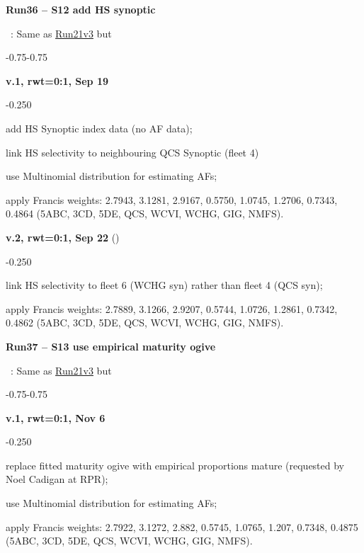 \hypertarget{R36}{\textbf{Run36 -- S12 add HS synoptic}}~: Same as \hyperlink{R21}{Run21v3} but
\begin{itemize_csas}{-0.75}{-0.75}
	\item \textbf{v.1, rwt=0:1, Sep 19}
	\begin{itemize_csas}{-0.25}{0}
		\item add HS Synoptic index data (no AF data);
		\item link HS selectivity to neighbouring QCS Synoptic (fleet 4)
		\item use Multinomial distribution for estimating AFs;
		\item apply Francis weights: 2.7943, 3.1281, 2.9167, 0.5750, 1.0745, 1.2706, 0.7343, 0.4864 (5ABC, 3CD, 5DE, QCS, WCVI, WCHG, GIG, NMFS).
	\end{itemize_csas}
	\item \textbf{v.2, rwt=0:1, Sep 22} ()
	\begin{itemize_csas}{-0.25}{0}
		\item link HS selectivity to fleet 6 (WCHG syn) rather than fleet 4 (QCS syn);
		\item apply Francis weights: 2.7889, 3.1266, 2.9207, 0.5744, 1.0726, 1.2861, 0.7342, 0.4862 (5ABC, 3CD, 5DE, QCS, WCVI, WCHG, GIG, NMFS).
	\end{itemize_csas}
\end{itemize_csas}

\hypertarget{R37}{\textbf{Run37 -- S13 use empirical maturity ogive}}~: Same as \hyperlink{R21}{Run21v3} but
\begin{itemize_csas}{-0.75}{-0.75}
	\item \textbf{v.1, rwt=0:1, Nov 6}
	\begin{itemize_csas}{-0.25}{0}
		\item replace fitted maturity ogive with empirical proportions mature (requested by Noel Cadigan at RPR);
		\item use Multinomial distribution for estimating AFs;
		\item apply Francis weights: 2.7922, 3.1272, 2.882, 0.5745, 1.0765, 1.207, 0.7348, 0.4875 (5ABC, 3CD, 5DE, QCS, WCVI, WCHG, GIG, NMFS).
	\end{itemize_csas}
\end{itemize_csas}


